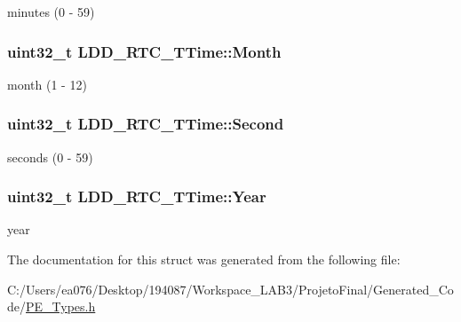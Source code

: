 minutes (0 -\/ 59) \hypertarget{struct_l_d_d___r_t_c___t_time_a2de1da3c8e42665975c2469125b04dfd}{
\subsubsection[{Month}]{\setlength{\rightskip}{0pt plus 5cm}uint32\-\_\-t L\-D\-D\-\_\-\-R\-T\-C\-\_\-\-T\-Time\-::\-Month}}\label{struct_l_d_d___r_t_c___t_time_a2de1da3c8e42665975c2469125b04dfd}
month (1 -\/ 12) \hypertarget{struct_l_d_d___r_t_c___t_time_ab6c770706c18542e856d56398850ac9e}{
\subsubsection[{Second}]{\setlength{\rightskip}{0pt plus 5cm}uint32\-\_\-t L\-D\-D\-\_\-\-R\-T\-C\-\_\-\-T\-Time\-::\-Second}}\label{struct_l_d_d___r_t_c___t_time_ab6c770706c18542e856d56398850ac9e}
seconds (0 -\/ 59) \hypertarget{struct_l_d_d___r_t_c___t_time_a16fbfb74b239e4b5e1889fe19d025d5e}{
\subsubsection[{Year}]{\setlength{\rightskip}{0pt plus 5cm}uint32\-\_\-t L\-D\-D\-\_\-\-R\-T\-C\-\_\-\-T\-Time\-::\-Year}}\label{struct_l_d_d___r_t_c___t_time_a16fbfb74b239e4b5e1889fe19d025d5e}
year 

The documentation for this struct was generated from the following file\-:\begin{DoxyCompactItemize}
\item 
C\-:/\-Users/ea076/\-Desktop/194087/\-Workspace\-\_\-\-L\-A\-B3/\-Projeto\-Final/\-Generated\-\_\-\-Code/\hyperlink{_p_e___types_8h}{P\-E\-\_\-\-Types.\-h}\end{DoxyCompactItemize}
